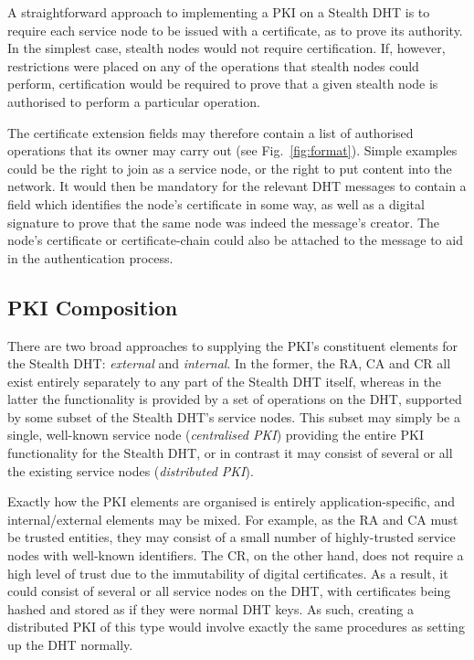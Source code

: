 \documentclass{elsart3p}
\begin{document}
A straightforward approach to implementing a PKI on a Stealth DHT is
to require each service node to be issued with a certificate, as to
prove its authority. In the simplest case, stealth nodes would not
require certification. If, however, restrictions were placed on any
of the operations that stealth nodes could perform, certification
would be required to prove that a given stealth node is authorised
to perform a particular operation.

The certificate extension fields may therefore contain a list of authorised
operations that its owner may carry out (see Fig.~\ref{fig:format}).
Simple examples could be the right to join as a service node, or the right
to put content into the network. It would then be mandatory for the
relevant DHT messages to contain a field which identifies the node's
certificate in some way, as well as a digital signature to prove
that the same node was indeed the message's creator. The node's
certificate or certificate-chain could also be attached to the
message to aid in the authentication process.

\subsection{PKI Composition}
\label{subsect-joinandauth}

There are two broad approaches to supplying the PKI's constituent
elements for the Stealth DHT: \emph{external} and \emph{internal}.
In the former, the RA, CA and CR all exist entirely separately to
any part of the Stealth DHT itself, whereas in the latter the
functionality is provided by a set of operations on the DHT,
supported by some subset of the Stealth DHT's service nodes. This
subset may simply be a single, well-known service node
(\emph{centralised PKI}) providing the entire PKI functionality for
the Stealth DHT, or in contrast it may consist of several or all the
existing service nodes (\emph{distributed PKI}).

Exactly how the PKI elements are organised is entirely
application-specific, and internal/external elements may be mixed.
For example, as the RA and CA must be trusted entities, they may
consist of a small number of highly-trusted service nodes with
well-known identifiers. The CR, on the other hand, does not require
a high level of trust due to the immutability of digital
certificates. As a result, it could consist of several or all
service nodes on the DHT, with certificates being hashed and stored
as if they were normal DHT keys. As such, creating a distributed PKI
of this type would involve exactly the same procedures as setting up
the DHT normally.
\end{document}

